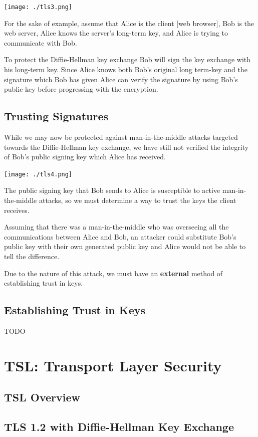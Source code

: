 \documentclass[11pt]{article} %
\begin{document}
\texttt{[image: ./tls3.png]}

For the sake of example, assume that Alice is the client [web browser], Bob is 
the web server, Alice knows the server's long-term key, and Alice is trying to
communicate with Bob.

\bigskip
To protect the Diffie-Hellman key exchange Bob will sign the key exchange with 
his long-term key.  Since Alice knows both Bob's original long term-key and the
signature which Bob has given Alice can verify the signature by using Bob's
public key before progressing with the encryption.

\newpage
\subsection{Trusting Signatures}
While we may now be protected against man-in-the-middle attacks targeted towards
the Diffie-Hellman key exchange, we have still not verified the integrity of
Bob's public signing key which Alice has received.

\texttt{[image: ./tls4.png]}

The public signing key that Bob sends to Alice is susceptible to
active man-in-the-middle attacks, so we must determine a way to trust the keys 
the client receives.

\bigskip
Assuming that there was a man-in-the-middle who was overseeing all the
communications between Alice and Bob, an attacker could substitute Bob's public
key with their own generated public key and Alice would not be able to tell 
the difference.

\bigskip
Due to the nature of this attack, we must have an \textbf{external} method of
establishing trust in keys.

\newpage
\subsection{Establishing Trust in Keys}
TODO

\newpage
\section{TSL: Transport Layer Security}

\subsection{TSL Overview}

\newpage
\subsection{TLS 1.2 with Diffie-Hellman Key Exchange}
\end{document}
